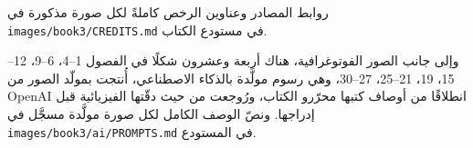 روابط المصادر وعناوين الرخص كاملةً لكل صورة مذكورة
في \texttt{images/book3/CREDITS.md} في مستودع الكتاب.

\bigskip
وإلى جانب الصور الفوتوغرافية، هناك أربعة وعشرون شكلًا في الفصول
1--4، 6--9، 12--15، 19، 21--25، 27--30، وهي رسوم مولَّدة بالذكاء
الاصطناعي، أُنتجت بمولّد الصور من OpenAI انطلاقًا من أوصاف كتبها
محرّرو الكتاب، ورُوجعت من حيث دقّتها الفيزيائية قبل إدراجها. ونصّ
الوصف الكامل لكل صورة مولَّدة مسجَّل في
\texttt{images/book3/ai/PROMPTS.md} في المستودع.
\clearpage
